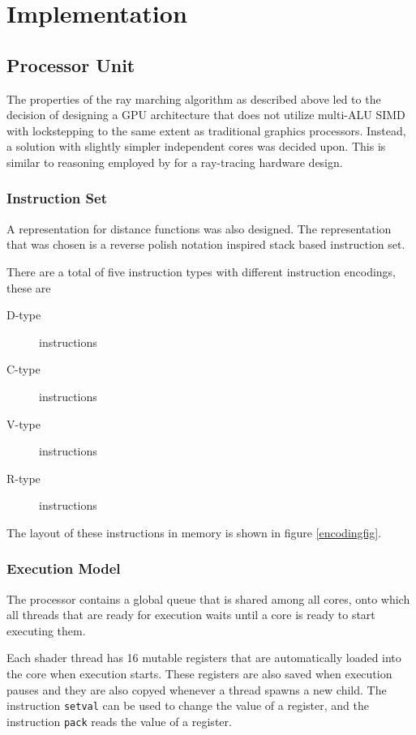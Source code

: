 \chapter{Implementation}

\section{Processor Unit}
	The properties of the ray marching algorithm as described above led to the
	decision of designing a GPU architecture that does not utilize multi-ALU 
	SIMD with lockstepping to the same extent as traditional graphics 
	processors. Instead, a solution with slightly simpler independent cores was
	decided upon. This is similar to reasoning employed by \cite{Woop2005} for a
	ray-tracing hardware design.

	\subsection{Instruction Set}
		A representation for distance functions was also designed. The 
		representation that was chosen is a reverse polish notation inspired 
		stack based instruction set.

		There are a total of five instruction types with different instruction 
		encodings, these are
		\begin{description}
			\item[D-type] instructions
			\item[C-type] instructions
			\item[V-type] instructions
			\item[R-type] instructions
		\end{description}
		The layout of these instructions in memory is shown in figure
		\ref{encodingfig}.
	
	\subsection{Execution Model}
		The processor contains a global queue that is shared among all cores,
		onto which all threads that are ready for execution waits until a core
		is ready to start executing them.
		
		Each shader thread has 16 mutable registers that are automatically 
		loaded into the core when execution starts. These registers are also
		saved when execution pauses and they are also copyed whenever a thread 
		spawns a new child. The instruction \texttt{setval} can be used to 
		change the value of a register, and the instruction \texttt{pack} reads
		the value of a register.

